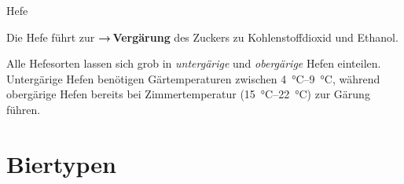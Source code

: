 \documentclass[9pt, ngerman]{beamer}
\newcommand{\forward}[1]{\textbf{→\,#1}}
\begin{document}
\begin{frame}{Hefe}

  Die Hefe führt zur \forward{Vergärung} des Zuckers zu Kohlenstoffdioxid und
  Ethanol.

  Alle Hefesorten lassen sich grob in \emph{untergärige} und \emph{obergärige}
  Hefen einteilen. Untergärige Hefen benötigen Gärtemperaturen zwischen
  \SIrange{4}{9}{\celsius}, während obergärige Hefen bereits bei
  Zimmertemperatur (\SIrange{15}{22}{\celsius}) zur Gärung führen.

\end{frame}

\section{Biertypen}
\end{document}
